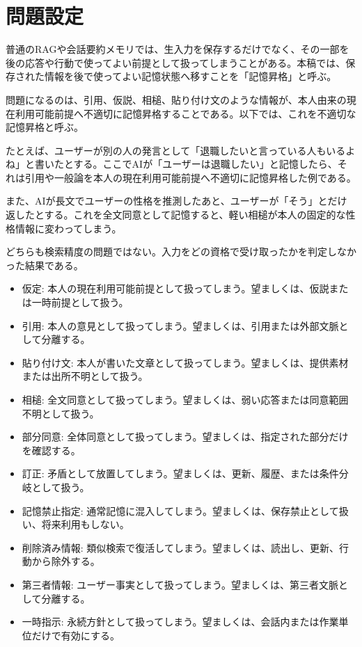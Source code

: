 \documentclass[12pt,a4paper]{article}
\begin{document}
\section{問題設定}\label{ux554fux984cux8a2dux5b9a}

普通のRAGや会話要約メモリでは、生入力を保存するだけでなく、その一部を後の応答や行動で使ってよい前提として扱ってしまうことがある。本稿では、保存された情報を後で使ってよい記憶状態へ移すことを「記憶昇格」と呼ぶ。

問題になるのは、引用、仮説、相槌、貼り付け文のような情報が、本人由来の現在利用可能前提へ不適切に記憶昇格することである。以下では、これを不適切な記憶昇格と呼ぶ。

たとえば、ユーザーが別の人の発言として「退職したいと言っている人もいるよね」と書いたとする。ここでAIが「ユーザーは退職したい」と記憶したら、それは引用や一般論を本人の現在利用可能前提へ不適切に記憶昇格した例である。

また、AIが長文でユーザーの性格を推測したあと、ユーザーが「そう」とだけ返したとする。これを全文同意として記憶すると、軽い相槌が本人の固定的な性格情報に変わってしまう。

どちらも検索精度の問題ではない。入力をどの資格で受け取ったかを判定しなかった結果である。

\begin{itemize}
\tightlist
\item
  仮定: 本人の現在利用可能前提として扱ってしまう。望ましくは、仮説または一時前提として扱う。
\item
  引用: 本人の意見として扱ってしまう。望ましくは、引用または外部文脈として分離する。
\item
  貼り付け文: 本人が書いた文章として扱ってしまう。望ましくは、提供素材または出所不明として扱う。
\item
  相槌: 全文同意として扱ってしまう。望ましくは、弱い応答または同意範囲不明として扱う。
\item
  部分同意: 全体同意として扱ってしまう。望ましくは、指定された部分だけを確認する。
\item
  訂正: 矛盾として放置してしまう。望ましくは、更新、履歴、または条件分岐として扱う。
\item
  記憶禁止指定: 通常記憶に混入してしまう。望ましくは、保存禁止として扱い、将来利用もしない。
\item
  削除済み情報: 類似検索で復活してしまう。望ましくは、読出し、更新、行動から除外する。
\item
  第三者情報: ユーザー事実として扱ってしまう。望ましくは、第三者文脈として分離する。
\item
  一時指示: 永続方針として扱ってしまう。望ましくは、会話内または作業単位だけで有効にする。
\end{itemize}
\end{document}
